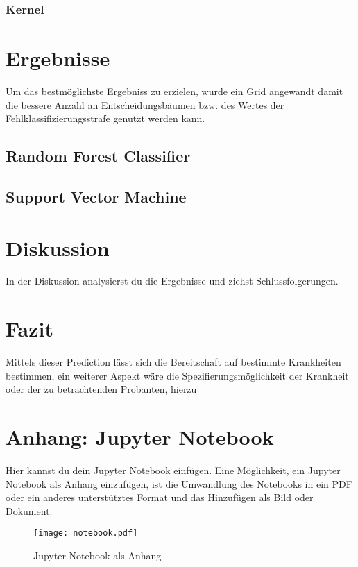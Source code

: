 \documentclass[a4paper,12pt]{article}
\begin{document}
\subsubsection{Kernel}

\section{Ergebnisse}
Um das bestmöglichste Ergebniss zu erzielen, wurde ein Grid angewandt damit die bessere Anzahl an Entscheidungsbäumen bzw.
des Wertes der Fehlklassifizierungsstrafe genutzt werden kann.
\subsection{Random Forest Classifier}

\subsection{Support Vector Machine}
\section{Diskussion}
In der Diskussion analysierst du die Ergebnisse und ziehst Schlussfolgerungen.

\section{Fazit}
Mittels dieser Prediction lässt sich die Bereitschaft auf bestimmte Krankheiten bestimmen, ein weiterer Aspekt wäre die
Spezifierungsmöglichkeit der Krankheit oder der zu betrachtenden Probanten, hierzu
\newpage

\appendix
\section{Anhang: Jupyter Notebook}
Hier kannst du dein Jupyter Notebook einfügen. Eine Möglichkeit, ein Jupyter Notebook als Anhang einzufügen, ist die Umwandlung des Notebooks in ein PDF oder ein anderes unterstütztes Format und das Hinzufügen als Bild oder Dokument.

\begin{figure}[h!]
    \centering
    \texttt{[image: notebook.pdf]}
    \caption{Jupyter Notebook als Anhang}
\end{figure}
\end{document}
